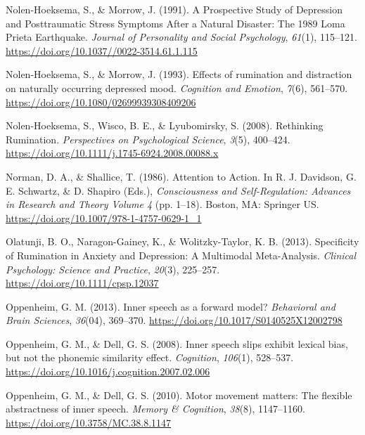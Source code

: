 \documentclass[a4paper,12pt,twoside,onecolumn,openright,final,oldfontcommands]{memoir}
\begin{document}
\leavevmode\hypertarget{ref-nolen-hoeksema_prospective_1991}{}%
Nolen-Hoeksema, S., \& Morrow, J. (1991). A Prospective Study of Depression and Posttraumatic Stress Symptoms After a Natural Disaster: The 1989 Loma Prieta Earthquake. \emph{Journal of Personality and Social Psychology}, \emph{61}(1), 115--121. \url{https://doi.org/10.1037//0022-3514.61.1.115}

\leavevmode\hypertarget{ref-nolen-hoeksema_effects_1993}{}%
Nolen-Hoeksema, S., \& Morrow, J. (1993). Effects of rumination and distraction on naturally occurring depressed mood. \emph{Cognition and Emotion}, \emph{7}(6), 561--570. \url{https://doi.org/10.1080/02699939308409206}

\leavevmode\hypertarget{ref-Nolen-Hoeksema2008}{}%
Nolen-Hoeksema, S., Wisco, B. E., \& Lyubomirsky, S. (2008). Rethinking Rumination. \emph{Perspectives on Psychological Science}, \emph{3}(5), 400--424. \url{https://doi.org/10.1111/j.1745-6924.2008.00088.x}

\leavevmode\hypertarget{ref-norman_attention_1986}{}%
Norman, D. A., \& Shallice, T. (1986). Attention to Action. In R. J. Davidson, G. E. Schwartz, \& D. Shapiro (Eds.), \emph{Consciousness and Self-Regulation: Advances in Research and Theory Volume 4} (pp. 1--18). Boston, MA: Springer US. \url{https://doi.org/10.1007/978-1-4757-0629-1_1}

\leavevmode\hypertarget{ref-olatunji_specificity_2013}{}%
Olatunji, B. O., Naragon-Gainey, K., \& Wolitzky-Taylor, K. B. (2013). Specificity of Rumination in Anxiety and Depression: A Multimodal Meta-Analysis. \emph{Clinical Psychology: Science and Practice}, \emph{20}(3), 225--257. \url{https://doi.org/10.1111/cpsp.12037}

\leavevmode\hypertarget{ref-oppenheim_inner_2013}{}%
Oppenheim, G. M. (2013). Inner speech as a forward model? \emph{Behavioral and Brain Sciences}, \emph{36}(04), 369--370. \url{https://doi.org/10.1017/S0140525X12002798}

\leavevmode\hypertarget{ref-oppenheim_inner_2008}{}%
Oppenheim, G. M., \& Dell, G. S. (2008). Inner speech slips exhibit lexical bias, but not the phonemic similarity effect. \emph{Cognition}, \emph{106}(1), 528--537. \url{https://doi.org/10.1016/j.cognition.2007.02.006}

\leavevmode\hypertarget{ref-oppenheim_motor_2010}{}%
Oppenheim, G. M., \& Dell, G. S. (2010). Motor movement matters: The flexible abstractness of inner speech. \emph{Memory \& Cognition}, \emph{38}(8), 1147--1160. \url{https://doi.org/10.3758/MC.38.8.1147}
\end{document}

